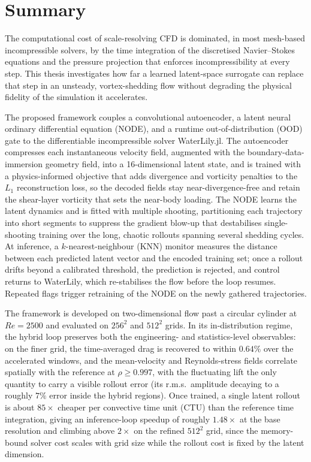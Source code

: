 \chapter*{Summary}

The computational cost of scale-resolving CFD is dominated, in most mesh-based incompressible solvers, by the time integration of the discretised Navier--Stokes equations and the pressure projection that enforces incompressibility at every step. This thesis investigates how far a learned latent-space surrogate can replace that step in an unsteady, vortex-shedding flow without degrading the physical fidelity of the simulation it accelerates.

The proposed framework couples a convolutional autoencoder, a latent neural ordinary differential equation (NODE), and a runtime out-of-distribution (OOD) gate to the differentiable incompressible solver WaterLily.jl. The autoencoder compresses each instantaneous velocity field, augmented with the boundary-data-immersion geometry field, into a 16-dimensional latent state, and is trained with a physics-informed objective that adds divergence and vorticity penalties to the $L_1$ reconstruction loss, so the decoded fields stay near-divergence-free and retain the shear-layer vorticity that sets the near-body loading. The NODE learns the latent dynamics and is fitted with multiple shooting, partitioning each trajectory into short segments to suppress the gradient blow-up that destabilises single-shooting training over the long, chaotic rollouts spanning several shedding cycles. At inference, a $k$-nearest-neighbour (KNN) monitor measures the distance between each predicted latent vector and the encoded training set; once a rollout drifts beyond a calibrated threshold, the prediction is rejected, and control returns to WaterLily, which re-stabilises the flow before the loop resumes. Repeated flags trigger retraining of the NODE on the newly gathered trajectories.

The framework is developed on two-dimensional flow past a circular cylinder at $Re = 2500$ and evaluated on $256^2$ and $512^2$ grids. In its in-distribution regime, the hybrid loop preserves both the engineering- and statistics-level observables: on the finer grid, the time-averaged drag is recovered to within $0.64\%$ over the accelerated windows, and the mean-velocity and Reynolds-stress fields correlate spatially with the reference at $\rho \geq 0.997$, with the fluctuating lift the only quantity to carry a visible rollout error (its r.m.s.\ amplitude decaying to a roughly $7\%$ error inside the hybrid regions). Once trained, a single latent rollout is about $85\times$ cheaper per convective time unit (CTU) than the reference time integration, giving an inference-loop speedup of roughly $1.48\times$ at the base resolution and climbing above $2\times$ on the refined $512^2$ grid, since the memory-bound solver cost scales with grid size while the rollout cost is fixed by the latent dimension.

